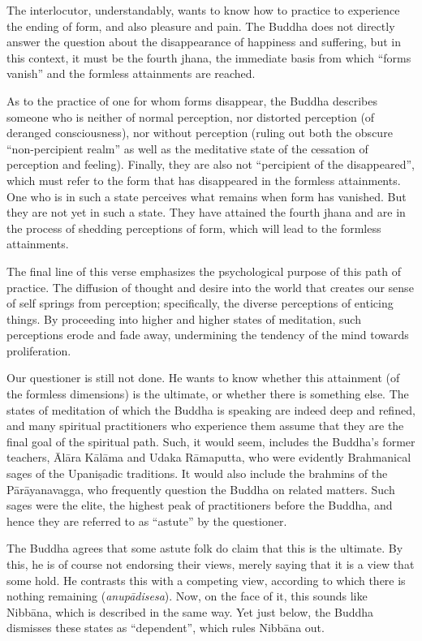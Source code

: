 \documentclass[12pt,openany]{book}%
\begin{document}
The interlocutor, understandably, wants to know how to practice to experience the ending of form, and also pleasure and pain. The Buddha does not directly answer the question about the disappearance of happiness and suffering, but in this context, it must be the fourth jhana, the immediate basis from which “forms vanish” and the formless attainments are reached.

As to the practice of one for whom forms disappear, the Buddha describes someone who is neither of normal perception, nor distorted perception (of deranged consciousness), nor without perception (ruling out both the obscure “non-percipient realm” as well as the meditative state of the cessation of perception and feeling). Finally, they are also not “percipient of the disappeared”, which must refer to the form that has disappeared in the formless attainments. One who is in such a state perceives what remains when form has vanished. But they are not yet in such a state. They have attained the fourth jhana and are in the process of shedding perceptions of form, which will lead to the formless attainments.

The final line of this verse emphasizes the psychological purpose of this path of practice. The diffusion of thought and desire into the world that creates our sense of self springs from perception; specifically, the diverse perceptions of enticing things. By proceeding into higher and higher states of meditation, such perceptions erode and fade away, undermining the tendency of the mind towards proliferation.

Our questioner is still not done. He wants to know whether this attainment (of the formless dimensions) is the ultimate, or whether there is something else. The states of meditation of which the Buddha is speaking are indeed deep and refined, and many spiritual practitioners who experience them assume that they are the final goal of the spiritual path. Such, it would seem, includes the Buddha’s former teachers, \textsanskrit{Ālāra} \textsanskrit{Kālāma} and Udaka \textsanskrit{Rāmaputta}, who were evidently Brahmanical sages of the \textsanskrit{Upaniṣadic} traditions. It would also include the brahmins of the \textsanskrit{Pārāyanavagga}, who frequently question the Buddha on related matters. Such sages were the elite, the highest peak of practitioners before the Buddha, and hence they are referred to as “astute” by the questioner.

The Buddha agrees that some astute folk do claim that this is the ultimate. By this, he is of course not endorsing their views, merely saying that it is a view that some hold. He contrasts this with a competing view, according to which there is nothing remaining (\textit{\textsanskrit{anupādisesa}}). Now, on the face of it, this sounds like \textsanskrit{Nibbāna}, which is described in the same way. Yet just below, the Buddha dismisses these states as “dependent”, which rules \textsanskrit{Nibbāna} out.
\end{document}
